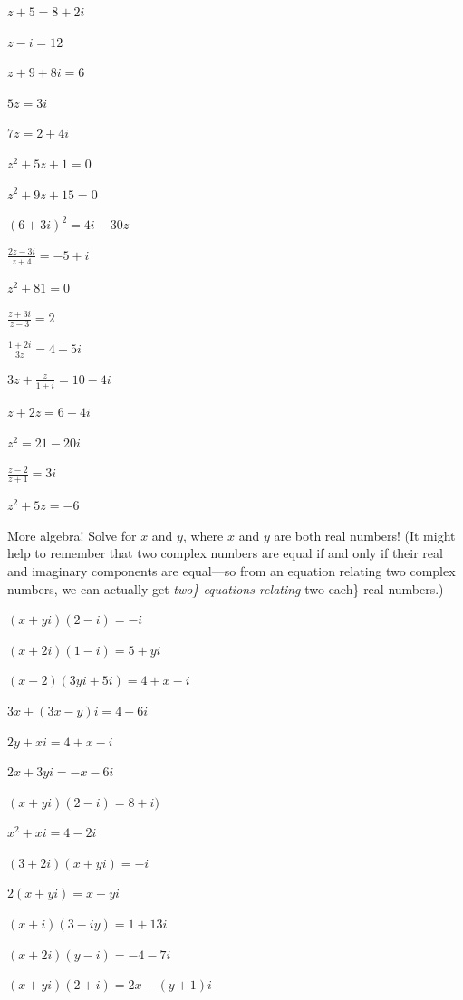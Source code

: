 \documentclass[
]{article}
\begin{document}
\begin{multicols}{2}
\setlength{\columnseprule}{.5pt}
\begin{problems}
\setcounter{enumi}{32}
\item $z+5 = 8+2i$
\item $z-i = 12$
\item $z+9+8i = 6$
\item $5z = 3i$
\item $7z = 2+4i$
\item $z^2 + 5z + 1 = 0$
\item $z^2 + 9z + 15 = 0$
\item $(6+3i)^2=4i-30z$
\item $\displaystyle \frac{2z-3i}{z+4} = -5+i$
\item $z^2+81 = 0$
\item $\displaystyle \frac{z+3i}{z-3} = 2$
\item $\displaystyle \frac{1+2i}{3z} = 4+5i$
\item $\displaystyle 3z+\frac{z}{1+i} = 10-4i$
\item $z + 2\overline{z} = 6-4i$
\item $z^2 = 21 - 20i$
\item $\displaystyle \frac{z-2}{z+1} =3i $
\item $z^2 + 5z = -6$
\end{problems}
\end{multicols}

\vspace{1pc}

\noindent More algebra! Solve for \(x\) and \(y\), where \(x\) and \(y\)
are both real numbers! (It might help to remember that two complex
numbers are equal if and only if their real and imaginary components are
equal---so from an equation relating two complex numbers, we can
actually get \emph{two\} equations relating }two each\} real numbers.)

\begin{multicols}{2}
\setlength{\columnseprule}{.5pt}
\begin{problems}
\setcounter{enumi}{49}
\item $(x+yi)(2-i)=-i$
\item $(x+2i)(1-i) = 5+yi$
\item $(x-2)(3yi+5i) = 4+x-i$
\item $3x + (3x - y)i = 4 - 6i$ 
\item $2y+xi= 4+x-i$
\item $2x+3yi = -x-6i$
\item $(x+yi)(2-i)=8+i)$
\item $x^2+xi=4-2i$
\item $(3+2i)(x+yi)=-i$
\item $2(x+yi)=x-yi$
\item $(x+i)(3-iy)=1+13i$
\item $(x+2i)(y-i)=-4-7i$
\item $(x+yi)(2+i) = 2x- (y+1)i$
\end{problems}
\end{multicols}
\end{document}

